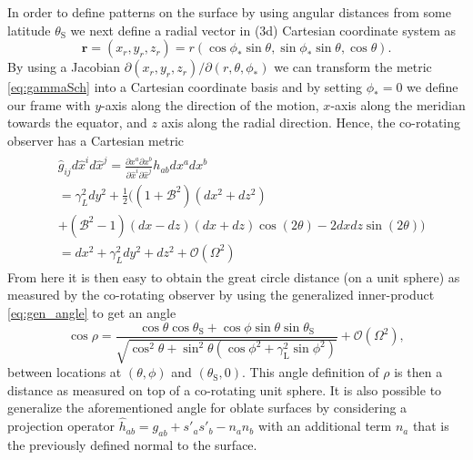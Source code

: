 \documentclass[iop, usenatbib]{emulateapj}
\newcommand{\be}{\begin{equation}}
\newcommand{\ee}{\end{equation}}
\renewcommand{\vec}[1]{\ensuremath{\boldsymbol{#1}}​}
\begin{document}
In order to define patterns on the surface by using angular distances from some latitude $\theta_{\mathrm{S}}$ we next define a radial vector in (3d) Cartesian coordinate system as
\be
\vec{r} = (x_r, y_r, z_r) = r (\cos\phi_* \sin\theta, \sin\phi_* \sin\theta, \cos\theta).
\ee
By using a Jacobian $\partial(x_r, y_r, z_r)/\partial (r, \theta, \phi_*)$ we can transform the metric \eqref{eq:gammaSch} into a Cartesian coordinate basis and by setting $\phi_*=0$ we define our frame with $y$-axis along the direction of the motion, $x$-axis along the meridian towards the equator, and $z$ axis along the radial direction.
Hence, the co-rotating observer has a Cartesian metric
\begin{align}\begin{split}
& \hat{g}_{ij} d\hat{x}^i d\hat{x}^j = \frac{\partial x^a \partial x^b}{\partial \hat{x}^i \partial \hat{x}^j} h_{ab} dx^a dx^b  \\
&= \gamma_L^2 dy^2 + \frac{1}{2} ( (1+\mathcal{B}^2)(dx^2 + dz^2) \\
&+ (\mathcal{B}^2 - 1)(dx-dz)(dx + dz) \cos(2\theta) - 2dx dz \sin(2\theta) ) \\
& = dx^2 + \gamma_L^2 dy^2 + dz^2 + \mathcal{O}(\Omega^2)
\end{split}\end{align}
From here it is then easy to obtain the great circle distance (on a unit sphere) as measured by the co-rotating observer by using the generalized inner-product \eqref{eq:gen_angle} to get an angle
\be\label{eq:rel_cos}
\cos\rho = \frac{\cos\theta \cos\theta_\mathrm{S} + \cos\phi \sin\theta \sin\theta_{\mathrm{S}}}{\sqrt{ \cos^2\theta + \sin^2\theta (\cos\phi^2 + \gamma_{\mathrm{L}}^2 \sin\phi^2)}} + \mathcal{O}(\Omega^2), 
\ee
between locations at $(\theta, \phi)$ and $(\theta_{\mathrm{S}}, 0)$.
This angle definition of $\rho$ is then a distance as measured on top of a co-rotating unit sphere.
It is also possible to generalize the aforementioned angle for oblate surfaces by considering a projection operator $\hat{h}_{ab} = g_{ab} + s'_a s'_b - n_a n_b$ with an additional term $n_a$ that is the previously defined normal to the surface.
\end{document}
